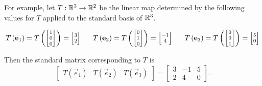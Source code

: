 \begin{applicationActivities}
\begin{definition}
\vspace{1em}

For example,
let \(T: \IR^3 \rightarrow \IR^2\) be the linear map determined by
the following values for \(T\) applied to the standard basis of \(\IR^3\).

\[\scriptsize
  T\left(\vec e_1 \right)
=
  T\left(\begin{bmatrix} 1 \\ 0 \\ 0 \end{bmatrix} \right)
=
  \begin{bmatrix} 3 \\ 2\end{bmatrix}
\hspace{2em}
  T\left(\vec e_2 \right)
=
  T\left(\begin{bmatrix} 0 \\ 1 \\ 0 \end{bmatrix} \right)
=
  \begin{bmatrix} -1 \\ 4\end{bmatrix}
\hspace{2em}
  T\left(\vec e_3 \right)
=
  T\left(\begin{bmatrix} 0 \\ 0 \\ 1 \end{bmatrix} \right)
=
  \begin{bmatrix} 5 \\ 0\end{bmatrix}
\]

Then the standard matrix corresponding to \(T\) is
\[
  \begin{bmatrix}T(\vec e_1) & T(\vec e_2) & T(\vec e_3)\end{bmatrix}
=
  \begin{bmatrix}3 & -1 & 5 \\ 2 & 4 & 0 \end{bmatrix}
.\]
\end{definition}


\end{applicationActivities}

